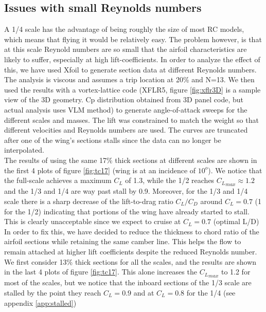 \documentclass[titlepage,10pt]{article}
\begin{document}
\newpage
\subsection{Issues with small Reynolds numbers}
A 1/4 scale has the advantage of being roughly the size of most RC models, which means that flying it would be relatively easy. The problem however, is that at this scale Reynold numbers are so small that the airfoil characteristics are likely to suffer, especially at high lift-coefficients. In order to analyze the effect of this, we have used Xfoil to generate section data at different Reynolds numbers. The analysis is viscous and assumes a trip location at 20\% and N=13. We then used the results with a vortex-lattice code (XFLR5, figure \ref{fig:xflr3D} is a sample view of the 3D geometry. Cp distribution obtained from 3D panel code, but actual analysis uses VLM method) to generate angle-of-attack sweeps for the different scales and masses. The lift was constrained to match the weight so that different velocities and Reynolds numbers are used. The curves are truncated after one of the wing's sections stalls since the data can no longer be interpolated. \\

The results of using the same 17\% thick sections at different scales are shown in the first 4 plots of figure \ref{fig:tc17} (wing is at an incidence of $10^o$). We notice that the full-scale achieves a maximum ${C_L}$ of 1.3, while the 1/2 reaches ${C_L}_{max}\approx1.2$ and the 1/3 and 1/4 are way past stall by 0.9. Moreover, for the 1/3 and 1/4 scale there is a sharp decrease of the lift-to-drag ratio ${C_L}/{C_D}$ around ${C_L}=0.7$ (1 for the 1/2) indicating that portions of the wing have already started to stall. This is clearly unacceptable since we expect to cruise at ${C_L}=0.7$ (optimal L/D)\\

In order to fix this, we have decided to reduce the thickness to chord ratio of the airfoil sections while retaining the same camber line. This helps the flow to remain attached at higher lift coefficients despite the reduced Reynolds number. We first consider 13\% thick sections for all the scales, and the results are shown in the last 4 plots of figure \ref{fig:tc17}. This alone increases the ${C_L}_{max}$ to 1.2 for most of the scales, but we notice that the inboard sections of the 1/3 scale are stalled by the point they reach ${C_L}=0.9$ and at ${C_L}=0.8$ for the 1/4 (see appendix \ref{app:stalled})\\
\end{document}
